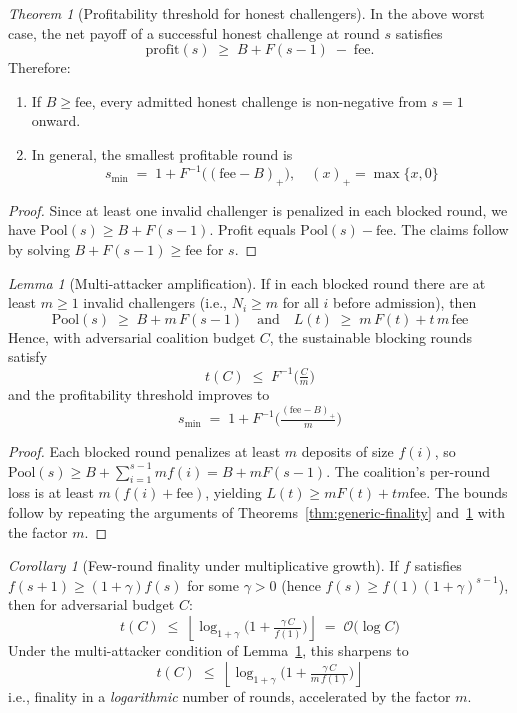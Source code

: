 \documentclass[3p]{elsarticle}
\theoremstyle{remark}
\newtheorem{theorem}{Theorem}
\newtheorem{lemma}{Lemma}
\newtheorem{corollary}{Corollary}
\begin{document}
\begin{theorem}[Profitability threshold for honest challengers]\label{thm:profit-fs}
In the above worst case, the net payoff of a successful honest challenge at round $s$ satisfies
\[
\mathrm{profit}(s)\;\ge\;B+F(s-1)\;-\;\mathrm{fee}.
\]
Therefore:
\begin{enumerate}
  \item If $B\ge \mathrm{fee}$, every admitted honest challenge is non-negative from $s=1$ onward.
  \item In general, the smallest profitable round is
  \[
    s_{\min}\;=\;1+F^{-1}\!\big((\mathrm{fee}-B)_+\big), \quad (x)_+=\max\{x,0\}
  \]
\end{enumerate}
\end{theorem}

\begin{proof}
Since at least one invalid challenger is penalized in each blocked round, we have $\mathrm{Pool}(s)\ge B+F(s-1)$. Profit equals $\mathrm{Pool}(s)-\mathrm{fee}$. The claims follow by solving $B+F(s-1)\ge \mathrm{fee}$ for $s$.
\end{proof}

\begin{lemma}[Multi-attacker amplification]\label{lem:multi}
If in each blocked round there are at least $m\ge1$ invalid challengers (i.e., $N_i\ge m$ for all $i$ before admission), then
\[
\mathrm{Pool}(s)\;\ge\;B+m\,F(s-1)\quad\text{and}\quad
L(t)\;\ge\;m\,F(t)+t\,m\,\mathrm{fee}
\]
Hence, with adversarial coalition budget $C$, the sustainable blocking rounds satisfy
\[
t(C)\;\le\;F^{-1}\!\Big(\tfrac{C}{m}\Big)
\]
and the profitability threshold improves to
\[
s_{\min}\;=\;1+F^{-1}\!\big(\tfrac{(\mathrm{fee}-B)_+}{m}\big)
\]
\end{lemma}

\begin{proof}
Each blocked round penalizes at least $m$ deposits of size $f(i)$, so $\mathrm{Pool}(s)\ge B+\sum_{i=1}^{s-1} m f(i)=B+mF(s-1)$. The coalition’s per-round loss is at least $m(f(i)+\mathrm{fee})$, yielding $L(t)\ge mF(t)+tm\mathrm{fee}$. The bounds follow by repeating the arguments of Theorems~\ref{thm:generic-finality} and~\ref{thm:profit-fs} with the factor $m$.
\end{proof}

\begin{corollary}[Few-round finality under multiplicative growth]\label{cor:multiplicative}
If $f$ satisfies $f(s+1)\ge (1+\gamma)f(s)$ for some $\gamma>0$ (hence $f(s)\ge f(1)(1+\gamma)^{s-1}$), then for adversarial budget $C$:
\[
t(C)\;\le\;\left\lfloor \log_{1+\gamma}\!\Big(1+\tfrac{\gamma\,C}{f(1)}\Big)\right\rfloor
\;=\;\mathcal{O}\!\big(\log C\big)
\]
Under the multi-attacker condition of Lemma~\ref{lem:multi}, this sharpens to
\[
t(C)\;\le\;\left\lfloor \log_{1+\gamma}\!\Big(1+\tfrac{\gamma\,C}{m\,f(1)}\Big)\right\rfloor
\]
i.e., finality in a \emph{logarithmic} number of rounds, accelerated by the factor $m$.
\end{corollary}
\end{document}
